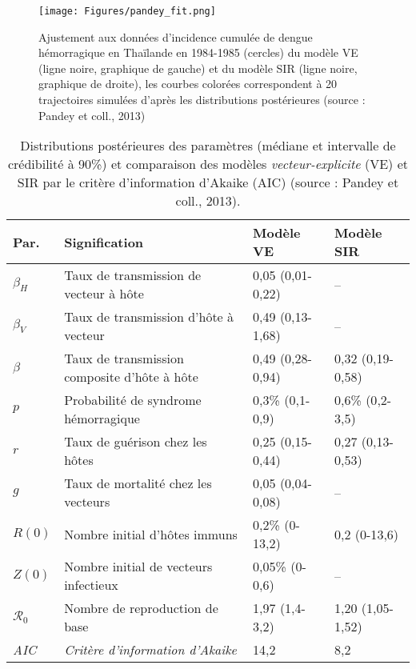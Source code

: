 \begin{figure}[t]
	\centering
	\texttt{[image: Figures/pandey\_fit.png]}
	\caption{Ajustement aux données d'incidence cumulée de dengue hémorragique en Thaïlande en 1984-1985 (cercles) du modèle VE (ligne noire, graphique de gauche) et du modèle SIR (ligne noire, graphique de droite), les courbes colorées correspondent à 20 trajectoires simulées d'après les distributions postérieures (source : Pandey et coll., 2013)}
	\label{fig:pandey_figure_incidence}
\end{figure}

\begin{table}[t]
\centering
\caption{Distributions postérieures des paramètres (médiane et intervalle de crédibilité à 90\%) et comparaison des modèles {\em vecteur-explicite} (VE) et SIR par le critère d'information d'Akaike (AIC) (source : Pandey et coll., 2013). \vspace{.5em}}
\label{table:pandeyres}
\begin{tabular}{L{1.2cm}L{6cm}L{3cm}L{3cm}}
\hline 
Par. & Signification& Modèle VE & Modèle SIR \\
\hline
$\beta_H$ & Taux de transmission de vecteur à hôte & 0,05 (0,01-0,22) & -- \\
$\beta_V$ & Taux de transmission d'hôte à vecteur & 0,49 (0,13-1,68) & -- \\
$\beta$ & Taux de transmission composite d'hôte à hôte & 0,49 (0,28-0,94) & 0,32 (0,19-0,58) \\
$p$ & Probabilité de syndrome hémorragique & 0,3\% (0,1-0,9) &  0,6\% (0,2-3,5) \\
$r$ & Taux de guérison chez les hôtes & 0,25 (0,15-0,44) & 0,27 (0,13-0,53) \\
$g$ & Taux de mortalité chez les vecteurs & 0,05 (0,04-0,08) & -- \\
$R(0)$ & Nombre initial d'hôtes immuns & 0,2\% (0-13,2) & 0,2 (0-13,6) \\
$Z(0)$ & Nombre initial de vecteurs infectieux & 0,05\% (0-0,6) & --\\
\hline
$\mathcal{R}_0$& Nombre de reproduction de base & 1,97 (1,4-3,2) & 1,20 (1,05-1,52) \\
\hline
{\em AIC} & {\em Critère d'information d'Akaike} & { 14,2} & { 8,2} \\
\hline 
\end{tabular} 
\end{table}


